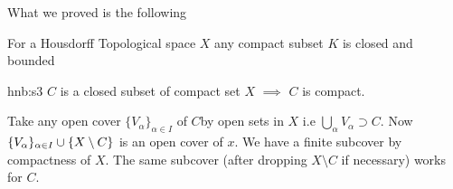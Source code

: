 What we proved is the following
\begin{Theorem}{}{}
	For a Housdorff Topological space $X$ any compact subset $K$ is closed and bounded
\end{Theorem}

\begin{Theorem}{}{hnb:s3}
	$C$ is a closed subset of compact set $X$ $\implies $ $C$ is compact.
\end{Theorem}
\begin{myproof}
	Take any open cover $\{V_{\alpha}\}_{\alpha\in I}$ of $C$by open sets in $X$ i.e $\bigcup\limits_{\alpha}V_{\alpha}\supset C$. Now $\{V_{\alpha}\}_{\alpha\in I} \cup \{X\setminus C\}$ is an open cover of $x$. We have a finite subcover by compactness of $X$. The same subcover (after dropping $X\setminus C$ if necessary) works for $C$.
\end{myproof}
